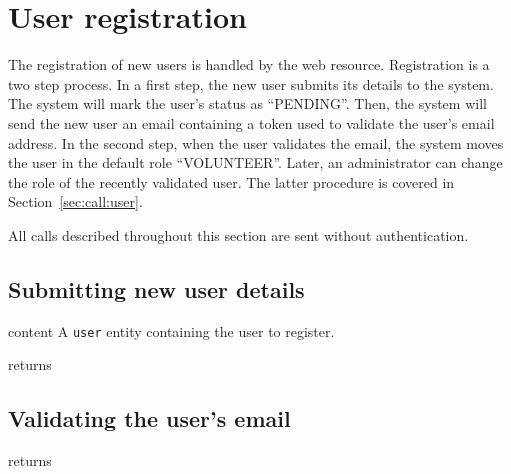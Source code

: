 \section{User registration}

The registration of new users is handled by the
web resource. Registration is a two step process. In a first step, the new user
submits its details to the system. The system will mark the user's status as
``PENDING''. Then, the system will send the new user an email containing a token
used to validate the user's email address. In the second step, when the user
validates the email, the system moves the user in the default role
``VOLUNTEER''. Later, an administrator can change the role of the recently
validated user. The latter procedure is covered in Section~\ref{sec:call:user}.

All calls described throughout this section are sent without authentication.

\subsection{Submitting new user details}

\begin{apidata}{content}
  A \texttt{user} entity containing the user to register.
\end{apidata}
\begin{apidata}{returns}
  \begin{datalist}
  \end{datalist}
\end{apidata}

\subsection{Validating the user's email}
\begin{apidata}{returns}
  \begin{datalist}
  \end{datalist}
\end{apidata}



